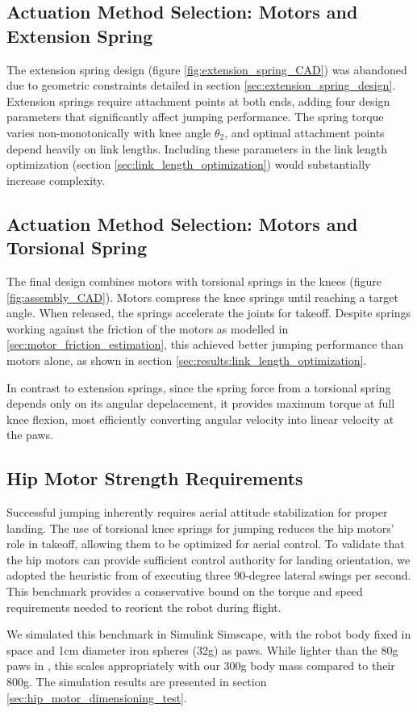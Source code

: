 \subsection{Actuation Method Selection: Motors and Extension Spring}

The extension spring design (figure \ref{fig:extension_spring_CAD}) was abandoned due to geometric constraints detailed in section \ref{sec:extension_spring_design}. Extension springs require attachment points at both ends, adding four design parameters that significantly affect jumping performance. The spring torque varies non-monotonically with knee angle $\theta_2$, and optimal attachment points depend heavily on link lengths. Including these parameters in the link length optimization (section \ref{sec:link_length_optimization}) would substantially increase complexity. 


\subsection{Actuation Method Selection: Motors and Torsional Spring}

The final design combines motors with torsional springs in the knees (figure \ref{fig:assembly_CAD}). Motors compress the knee springs until reaching a target angle. When released, the springs accelerate the joints for takeoff. Despite springs working against the friction of the motors as modelled in \ref{sec:motor_friction_estimation}, this achieved better jumping performance than motors alone, as shown in section \ref{sec:results:link_length_optimization}. 

In contrast to extension springs, since the spring force from a torsional spring depends only on its angular depelacement, it provides maximum torque at full knee flexion, most efficiently converting angular velocity into linear velocity at the paws.


\subsection{Hip Motor Strength Requirements}
\label{sec:hip_motor_dimensioning_test_design}

Successful jumping inherently requires aerial attitude stabilization for proper landing. The use of torsional knee springs for jumping reduces the hip motors' role in takeoff, allowing them to be optimized for aerial control. To validate that the hip motors can provide sufficient control authority for landing orientation, we adopted the heuristic from \cite{finn_tarek_master} of executing three 90-degree lateral swings per second. This benchmark provides a conservative bound on the torque and speed requirements needed to reorient the robot during flight.

We simulated this benchmark in Simulink Simscape, with the robot body fixed in space and 1cm diameter iron spheres (32g) as paws. While lighter than the 80g paws in \cite{finn_tarek_master}, this scales appropriately with our 300g body mass compared to their 800g. The simulation results are presented in section \ref{sec:hip_motor_dimensioning_test}.